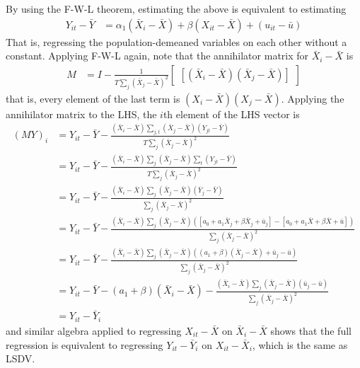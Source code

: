\documentclass[11pt]{article}
\begin{document}
\begin{enumerate}[1)]
\begin{enumerate}[(a)]
		By using the F-W-L theorem, estimating the above is equivalent to estimating
		\begin{align*}
			Y_{it} - \bar{Y} &= \alpha_1 (\bar{X}_i - \bar{X}) + \beta (X_{it} - \bar{X}) + (u_{it} - \bar{u}) 
		\end{align*}
		That is, regressing the population-demeaned variables on each other without a constant. Applying F-W-L again, note that the annihilator matrix for $\bar{X}_i - \bar{X}$ is
		\begin{align*}
			M &= I - \frac{1}{T \sum_{j} (\bar{X}_j - \bar{X})^2} \begin{bmatrix} [(\bar{X}_{i} - \bar{X})(\bar{X}_{j} - \bar{X})] \end{bmatrix}
		\end{align*}
		that is, every element of the last term is $(X_{i} - \bar{X})(X_j - \bar{X})$. Applying the annihilator matrix to the LHS, the $i$th element of the LHS vector is
		\begin{align*}
			(M Y)_i &= Y_{it} - \bar{Y} - \frac{(\bar{X}_i - \bar{X}) \sum_{j,t} \left( \bar{X}_j - \bar{X} \right) \left( Y_{jt} - \bar{Y} \right)  }{T \sum_{j} (\bar{X}_j - \bar{X})^2} \\
			&= Y_{it} - \bar{Y} - \frac{(\bar{X}_i - \bar{X}) \sum_{j} \left( \bar{X}_j - \bar{X} \right) \sum_t \left( Y_{jt} - \bar{Y} \right)  }{T \sum_{j} (\bar{X}_j - \bar{X})^2} \\
			&= Y_{it} - \bar{Y} - \frac{(\bar{X}_i - \bar{X}) \sum_{j} \left( \bar{X}_j - \bar{X} \right) \left( \bar{Y}_j - \bar{Y} \right)  }{\sum_{j} (\bar{X}_j - \bar{X})^2} \\
			&= Y_{it} - \bar{Y} - \frac{(\bar{X}_i - \bar{X}) \sum_{j} \left( \bar{X}_j - \bar{X} \right) \left( [a_0 + a_1 \bar{X}_j + \beta \bar{X}_j + \bar{u}_j] - [a_0 + a_1 \bar{X} + \beta \bar{X} + \bar{u}] \right)  }{\sum_{j} (\bar{X}_j - \bar{X})^2} \\
			&= Y_{it} - \bar{Y} - \frac{(\bar{X}_i - \bar{X}) \sum_{j} \left( \bar{X}_j - \bar{X} \right) \left( (a_1 + \beta) (\bar{X}_j - \bar{X}) + \bar{u}_j - \bar{u} \right)  }{\sum_{j} (\bar{X}_j - \bar{X})^2} \\
			&= Y_{it} - \bar{Y} - (a_1 + \beta) (\bar{X}_i - \bar{X}) - \frac{(\bar{X}_i - \bar{X}) \sum_{j} \left( \bar{X}_j - \bar{X} \right) \left( \bar{u}_j - \bar{u} \right)  }{\sum_{j} (\bar{X}_j - \bar{X})^2} \\
			&= Y_{it} - \bar{Y}_i
		\end{align*}
		and similar algebra applied to regressing $X_{it} - \bar{X}$ on $\bar{X}_i- \bar{X}$ shows that the full regression is equivalent to regressing $Y_{it} - \bar{Y}_i$ on $X_{it} -\bar{X}_i$, which is the same as LSDV.


\end{enumerate}
\end{enumerate}
\end{document}
